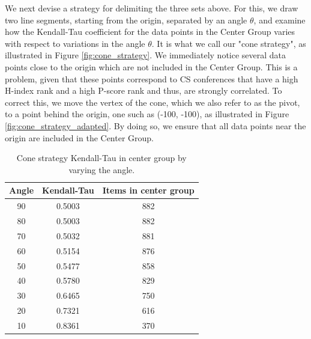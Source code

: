 \documentclass[man]{apa6}
\begin{document}
We next devise a strategy for delimiting the three sets
above. For this, we draw two line segments, starting from
the origin, separated by an angle $ \theta $, and examine
how the Kendall-Tau coefficient for the data points in the Center Group varies with respect to variations in the angle $ \theta $. It is what we call our "cone strategy", as illustrated in Figure \ref{fig:cone_strategy}. We immediately notice several data points close to the origin
which are not included in the Center Group. This is a problem, given that these points correspond to CS conferences that have a high H-index rank and a high
P-score rank and thus, are strongly correlated. To
correct this, we move the vertex of the cone, which we also
refer to as the pivot, to a point behind the origin, one
such as (-100, -100), as illustrated in Figure \ref{fig:cone_strategy_adapted}. By doing so, we ensure that all data points near the origin are included in the
Center Group.

\begin{table}[h!]
\centering
 \begin{tabular}{c c c} 
 \toprule
 Angle & Kendall-Tau & Items in center group \\ 
 \midrule
 
 90 & 0.5003 & 882 \\
 80 & 0.5003 & 882 \\
 70 & 0.5032 & 881 \\
 60 & 0.5154 & 876 \\
 50 & 0.5477 & 858 \\
 40 & 0.5780 & 829 \\
 30 & 0.6465 & 750 \\
 20 & 0.7321 & 616 \\
 10 & 0.8361 & 370 \\
 \bottomrule
 \end{tabular}
 \caption{Cone strategy Kendall-Tau in center group by varying the angle.}
 \label{tab:cone_strategy}
\end{table}
\end{document}

